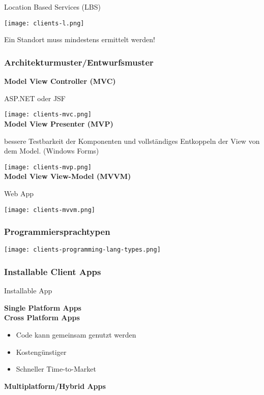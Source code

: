 Location Based Services (LBS)

\texttt{[image: clients-l.png]}

Ein Standort muss mindestens ermittelt werden!

\subsubsection{Architekturmuster/Entwurfsmuster}

\textbf{Model View Controller (MVC)}

ASP.NET oder JSF

\texttt{[image: clients-mvc.png]} \\


\textbf{Model View Presenter (MVP)}

bessere Testbarkeit der Komponenten und vollständiges Entkoppeln der View von dem Model. (Windows Forms)

\texttt{[image: clients-mvp.png]} \\

\textbf{Model View View-Model (MVVM)}

Web App

\texttt{[image: clients-mvvm.png]} \\

\vfill\null
\columnbreak

\subsubsection{Programmiersprachtypen}

\texttt{[image: clients-programming-lang-types.png]} \\

\subsubsection{Installable Client Apps}

Installable App

\textbf{Single Platform Apps} \\


\textbf{Cross Platform Apps}

\begin{itemize}
    \item Code kann gemeinsam genutzt werden
    \item Kostengünstiger
    \item Schneller Time-to-Market
\end{itemize}
\vspace{10pt}
\textbf{Multiplatform/Hybrid Apps}

